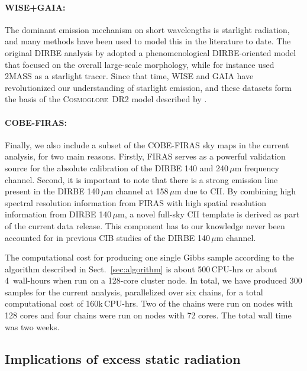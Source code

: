 \documentclass{aa}
\newcommand{\cosmoglobe}{\textsc{Cosmoglobe}}
\begin{document}
  \paragraph{WISE+GAIA:} The dominant emission mechanism on short
  wavelengths is starlight radiation, and many methods have been used
  to model this in the literature to date. The original DIRBE analysis
  by \citet{arendt1998} adopted a phenomenological DIRBE-oriented
  model that focused on the overall large-scale morphology, while for
  instance \citet{wright:2001} used 2MASS as a starlight tracer. Since
  that time, WISE \citep{wright:2010} and GAIA \citep{gaia:2016} have revolutionized our understanding of
  starlight emission, and these datasets form the basis of the
  \cosmoglobe\ DR2 model described by \citet{CG02_04}.

  \paragraph{COBE-FIRAS:} Finally, we also include a subset of the
  COBE-FIRAS \citep{mather:1994} sky maps in the current analysis, for two main
  reasons. Firstly, FIRAS serves as a powerful validation source for
  the absolute calibration of the DIRBE 140 and 240\,$\mu\mathrm{m}$
  frequency channel. Second, it is important to note that there is a
  strong emission line present in the DIRBE 140\,$\mu\mathrm{m}$
  channel at 158$\,\mu\mathrm{m}$ due to CII. By combining high
  spectral resolution information from FIRAS with high spatial
  resolution information from DIRBE 140\,$\mu\mathrm{m}$, a novel
  full-sky CII template is derived as part of the current data
  release. This component has to our knowledge never been accounted
  for in previous CIB studies of the DIRBE 140\,$\mu\mathrm{m}$ channel.

The computational cost for producing one single Gibbs sample according
to the algorithm described in Sect.~\ref{sec:algorithm} is about
500\,CPU-hrs or about 4~wall-hours when run on a 128-core cluster
node. In total, we have produced 300 samples for the current analysis,
parallelized over six chains, for a total computational cost of
160k\,CPU-hrs. Two of the chains were run on nodes with 128 cores and
four chains were run on nodes with 72 cores. The total wall time was
two weeks.


\subsection{Implications of excess static radiation}
\label{sec:excessrad}
\end{document}
